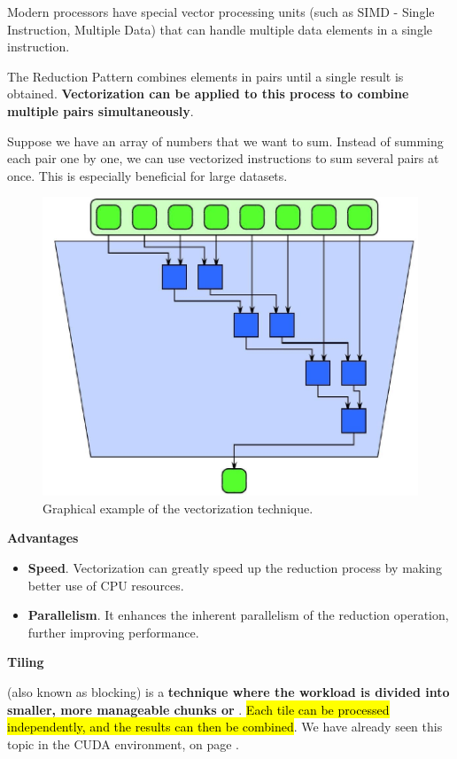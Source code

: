 \highspace
Modern processors have special vector processing units (such as SIMD - Single Instruction, Multiple Data) that can handle multiple data elements in a single instruction.

\highspace
The Reduction Pattern combines elements in pairs until a single result is obtained. \textbf{Vectorization can be applied to this process to combine multiple pairs simultaneously}.

\begin{examplebox}
    Suppose we have an array of numbers that we want to sum. Instead of summing each pair one by one, we can use vectorized instructions to sum several pairs at once. This is especially beneficial for large datasets.
\end{examplebox}

\begin{figure}[!htp]
    \centering
    \includegraphics[width=.55\textwidth]{img/reduction-pattern-2.pdf}
    \caption{Graphical example of the vectorization technique.}
\end{figure}

\begin{flushleft}
    \textcolor{Green3}{ \textbf{Advantages}}
\end{flushleft}
\begin{itemize}[label=\textcolor{Green3}{}]
    \item \textcolor{Green3}{\textbf{Speed}}. Vectorization can greatly speed up the reduction process by making better use of CPU resources.

    \item \textcolor{Green3}{\textbf{Parallelism}}. It enhances the inherent parallelism of the reduction operation, further improving performance.
\end{itemize}

\newpage

\begin{flushleft}
    \textcolor{Green3}{ \textbf{Tiling}}
\end{flushleft}
 (also known as blocking) is a \textbf{technique where the workload is divided into smaller, more manageable chunks or }. \hl{Each tile can be processed independently, and the results can then be combined}. We have already seen this topic in the CUDA environment, on page \pageref{subsubsection: Tiling Technique}.

